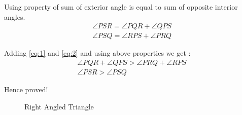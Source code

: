 Using property of sum of exterior angle is equal to sum of opposite interior angles.
\begin{align}
    \angle PSR = \angle PQR + \angle QPS
\\
    \angle PSQ = \angle RPS + \angle PRQ
\end{align}
 
 Adding \ref{eq:1} and \ref{eq:2} and using above properties we get :
 \begin{align}
     \angle PQR + \angle QPS > \angle PRQ + \angle RPS
\\
    \angle PSR > \angle PSQ
 \end{align}
 
 Hence proved!

\begin{figure}[h!]
\begin{center}
	\resizebox{\columnwidth/1}{!}{}
\end{center}
\caption{Right Angled Triangle}
\label{fig:Triangle}
\end{figure}

